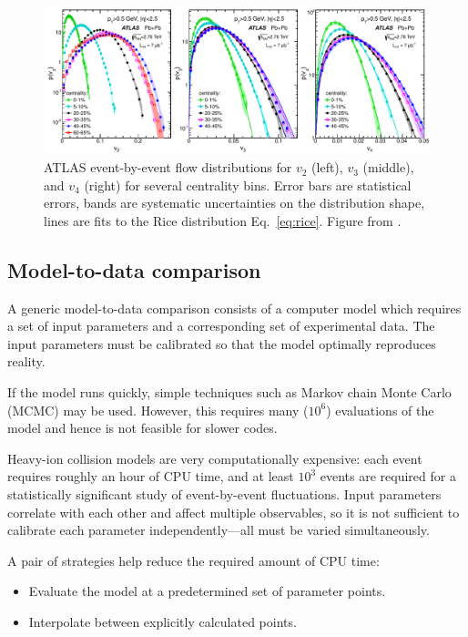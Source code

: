 \documentclass[reprint,amsmath]{revtex4-1}
\begin{document}
\begin{figure}[t]
  \centering
  \includegraphics[width=.85\textwidth]{atlas}
  \caption{ATLAS event-by-event flow distributions for $v_2$ (left), $v_3$ (middle), and $v_4$ (right) for several centrality bins.  Error
    bars are statistical errors, bands are systematic uncertainties on the distribution shape, lines are fits to the Rice distribution Eq.\
    \eqref{eq:rice}.  Figure from \cite{atlas-vn2}.}
  \label{fig:atlas}
\end{figure}

\subsection{Model-to-data comparison}

A generic model-to-data comparison consists of a computer model which requires a set of input parameters and a corresponding set of
experimental data.  The input parameters must be calibrated so that the model optimally reproduces reality.

If the model runs quickly, simple techniques such as Markov chain Monte Carlo (MCMC) may be used.  However, this requires many ($10^6$)
evaluations of the model and hence is not feasible for slower codes.

Heavy-ion collision models are very computationally expensive:  each event requires roughly an hour of CPU time, and at
least $10^3$ events are required for a statistically significant study of event-by-event fluctuations.  Input parameters correlate
with each other and affect multiple observables, so it is not sufficient to calibrate each parameter independently---all must be varied
simultaneously.

A pair of strategies help reduce the required amount of CPU time:
\begin{itemize}
  \item Evaluate the model at a predetermined set of parameter points.
  \item Interpolate between explicitly calculated points.
\end{itemize}
\end{document}
